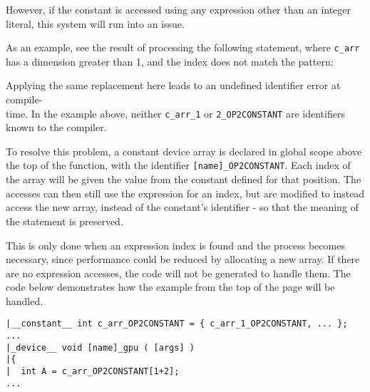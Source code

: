 \noindent However, if the constant is accessed using any expression other than an integer literal, this system will run into an issue.
\par As an example, see the result of processing the following statement, where \verb|c_arr| has a dimension greater than 1, and the index does not match the pattern:

\noindent Applying the same replacement here leads to an undefined identifier error at compile-\\time. In the example above, neither \verb|c_arr_1| or \verb|2_OP2CONSTANT| are identifiers known to the compiler.
\par
To resolve this problem, a constant device array is declared in global scope above the top of the function, with the identifier \verb|[name]_OP2CONSTANT|. Each index of the array will be given the value from the constant defined for that position. The accesses can then still use the expression for an index, but are modified to instead access the new array, instead of the constant's identifier - so that the meaning of the statement is preserved.
\par This is only done when an expression index is found and the process becomes necessary, since performance could be reduced by allocating a new array. If there are no expression accesses, the code will not be generated to handle them. The code below demonstrates how the example from the top of the page will be handled.
\begin{lstlisting}[backgroundcolor=\color{green!20}]
|__constant__ int c_arr_OP2CONSTANT = { c_arr_1_OP2CONSTANT, ... };
...
|_device__ void [name]_gpu ( [args] )
|{
|  int A = c_arr_OP2CONSTANT[1+2];
...
\end{lstlisting}

